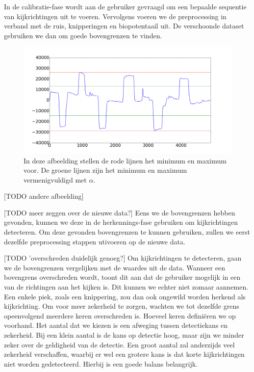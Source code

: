 \documentclass{article}
\begin{document}
In de calibratie-fase wordt aan de gebruiker gevraagd om een bepaalde sequentie van kijkrichtingen uit te voeren. Vervolgens voeren we de preprocessing in verband met de ruis, knipperingen en biopotentaail uit. De verschoonde dataset gebruiken we dan om goede bovengrenzen te vinden.


\begin{figure}[h]
\centering
\includegraphics[width=\linewidth]{images/thresholds_distribution}
\caption{In deze afbeelding stellen de rode lijnen het minimum en maximum voor. De groene lijnen zijn het minimum en maximum vermenigvuldigd met $\alpha$.}
\end{figure}

[TODO andere afbeelding]

[TODO meer zeggen over de nieuwe data?]
Eens we de bovengrenzen hebben gevonden, kunnen we deze in de herkennings-fase gebruiken om kijkrichtingen detecteren. Om deze gevonden bovengrenzen te kunnen gebruiken, zullen we eerst dezelfde preprocessing stappen utivoeren op de nieuwe data.

[TODO 'overschreden  duidelijk genoeg?]
Om kijkrichtingen te detecteren, gaan we de bovengrenzen vergelijken met de waardes uit de data. Wanneer een bovengrens overschreden wordt, toont dit aan dat de gebruiker mogelijk in een van de richtingen aan het kijken is. Dit kunnen we echter niet zomaar aannemen. Een enkele piek, zoals een knippering, zou dan ook ongewild worden herkend als kijkrichting. Om voor meer zekerheid te zorgen, wachten we tot dezelfde grens opeenvolgend meerdere keren overschreden is. Hoeveel keren definiëren we op voorhand. Het aantal dat we kiezen is een afweging tussen detectiekans en zekerheid. Bij een klein aantal is de kans op detectie hoog, maar zijn we minder zeker over de geldigheid van de detectie. Een groot aantal zal anderzijds veel zekerheid verschaffen, waarbij er wel een grotere kans is dat korte kijkrichtingen niet worden gedetecteerd. Hierbij is een goede balans belangrijk.
\end{document}
